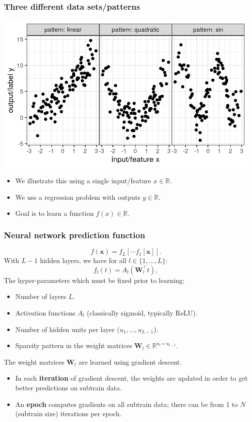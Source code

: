\documentclass{beamer}
\begin{document}
\begin{frame}
  \frametitle{Three different data sets/patterns}
  \includegraphics[width=\textwidth]{figure-overfitting-data}

  \begin{itemize}
   \item We illustrate this using a single input/feature
    $x\in\mathbb R$.
  \item We use a regression problem with outputs $y\in\mathbb R$.
  \item Goal is to learn a function $f(x)\in\mathbb R$.
  \end{itemize}
\end{frame}

\begin{frame}
  \frametitle{Neural network prediction function}
\begin{equation}
  f(\mathbf x) = f_L[\cdots f_1[\mathbf x] ].
\end{equation}
  With $L-1$ hidden layers, we have for all $l\in\{1,\dots,L\}$:
\begin{equation}
  f_l(t) = A_l( \mathbf W_l^\intercal t ),
\end{equation}
The hyper-parameters which must be fixed prior to learning:
\begin{itemize}
\item Number of layers $L$.
\item Activation functions $A_l$ (classically sigmoid, typically ReLU).
\item Number of hidden units per layer ($u_1,\dots,u_{L-1}$).
\item Sparsity pattern in the weight matrices $\mathbf W_l\in\mathbb R^{u_{l}\times u_{l-1}}$.
\end{itemize}
The weight matrices $\mathbf W_l$ are learned using gradient descent.
\begin{itemize}
\item In each \textbf{iteration} of gradient descent, the weights are
  updated in order to get better predictions on subtrain data.
\item An \textbf{epoch} computes gradients on all subtrain data;
  there can be from 1 to $N$(subtrain size) iterations per epoch.
\end{itemize}

\end{frame}
\end{document}
